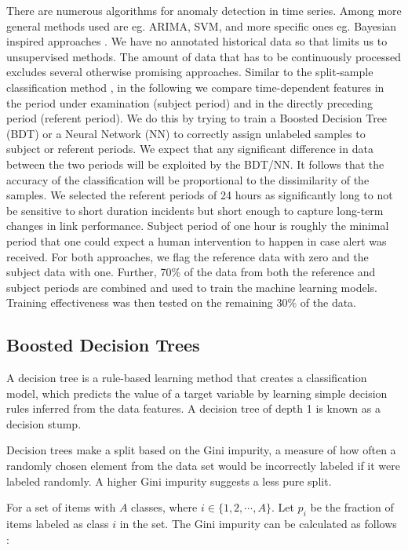 \documentclass[5p]{elsarticle}
\begin{document}
There are numerous algorithms for anomaly detection in time series. Among more general methods used are eg. ARIMA, SVM, and more specific ones eg. Bayesian inspired approaches \cite{sedam}. We have no annotated historical data so that limits us to unsupervised methods. The amount of data that has to be continuously processed excludes several otherwise promising approaches. Similar to the split-sample classification method \cite{sest}, in the following we compare time-dependent features in the period under examination (subject period) and in the directly preceding period (referent period). We do this by trying to train a Boosted Decision Tree (BDT)\cite{osam} or a Neural Network (NN) to correctly assign unlabeled samples to subject or referent periods.  We expect that any significant difference in data between the two periods will be exploited by the BDT/NN. It follows that the accuracy of the classification will be proportional to the dissimilarity of the samples. We selected the referent periods of 24 hours as significantly long to not be sensitive to short duration incidents but short enough to capture long-term changes in link performance. Subject period of one hour is roughly the minimal period that one could expect a human intervention to happen in case alert was received. For both approaches, we flag the reference data with zero and the subject data with one.  Further, 70\% of the data from both the reference and subject periods are combined and used to train the machine learning models. Training effectiveness was then tested on the remaining 30\% of the data.

\subsection{Boosted Decision Trees}

A decision tree is a rule-based learning method \cite{dva} that creates a classification model, which predicts the value of a target variable by learning simple decision rules inferred from the data features. A decision tree of depth 1 is known as a decision stump.

Decision trees make a split based on the Gini impurity, a measure of how often a randomly chosen element from the data set would be incorrectly labeled if it were labeled randomly. A higher Gini impurity suggests a less pure split.

For a set of items with $A$ classes, where $i \in \{ 1, 2, \cdots , A \} $. Let $p_i$ be the fraction of items labeled as class $i$ in the set. The Gini impurity can be calculated as follows \cite{devet}:
\end{document}
